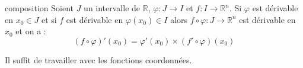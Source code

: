 \documentclass[a4paper,10pt]{report}
\begin{document}
%
%
%
%

\begin{Proposition}{composition} Soient $J$ un intervalle de $\mathbb{R}$, $\varphi : J \rightarrow I$ et $f : I \rightarrow \mathbb{R}^n$. Si $\varphi$ est dérivable en $x_0 \in J$ et si $f$ est dérivable en $\varphi(x_0) \in I$ alors $f \circ \varphi : J \rightarrow \mathbb{R}^n$ est dérivable en $x_0$ et on a :
$$ (f \circ \varphi)'(x_0) = \varphi'(x_0) \times (f' \circ \varphi)(x_0)$$
\end{Proposition}

\begin{Demonstration}{} Il suffit de travailler avec les fonctions coordonnées.
\end{Demonstration}

\end{document}
